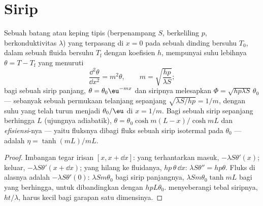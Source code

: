 \section{Sirip}

\begin{proposition}\label{prop:b2:heat-conduction:fin}
Sebuah batang atau keping tipis (berpenampang $S$, berkeliling $p$, berkonduktivitas $\lambda$)
yang terpasang di $x = 0$ pada sebuah dinding bersuhu $T_0$, dalam sebuah fluida bersuhu $T_{\text{f}}$ dengan
koefisien $h$, mempunyai suhu lebihnya $\theta = T - T_{\text{f}}$
yang menuruti
\[
\frac{\dd^2\theta}{\dd x^2} = m^2\theta, \qquad m = \sqrt{\frac{hp}{\lambda S}} ;
\]
bagi sebuah sirip panjang, $\theta = \theta_0\eu^{-mx}$ dan siripnya melesapkan $\Phi =
\sqrt{hp\lambda S}\,\theta_0$ --- sebanyak sebuah permukaan telanjang sepanjang $\sqrt{\lambda
S/hp} = 1/m$, dengan suhu yang telah turun menjadi $\theta_0/\eu$ di
$x = 1/m$. Bagi sebuah sirip sepanjang berhingga $L$ (ujungnya adiabatik), $\theta =
\theta_0\cosh m(L-x)/\cosh mL$ dan \emph{efisiensi}-nya --- yaitu fluksnya dibagi fluks sebuah sirip isotermal pada $\theta_0$ ---
adalah $\eta = \tanh(mL)/mL$.
\end{proposition}

\begin{proof}
Imbangan tegar irisan $[x, x + \dd x]$: yang terhantarkan masuk,
$-\lambda S\theta'(x)$; keluar, $-\lambda S\theta'(x + \dd x)$; yang hilang ke
fluidanya, $hp\,\theta\,\dd x$: $\lambda S\theta'' = hp\theta$. Fluks di
alasnya adalah $-\lambda S\theta'(0)$: $\lambda Sm\theta_0$ bagi sirip panjangnya,
$\lambda Sm\theta_0\tanh mL$ bagi yang berhingga, untuk dibandingkan dengan
$hpL\theta_0$.  menyeberangi tebal siripnya, $ht/\lambda$, harus
kecil bagi garapan satu dimensinya.
\end{proof}

